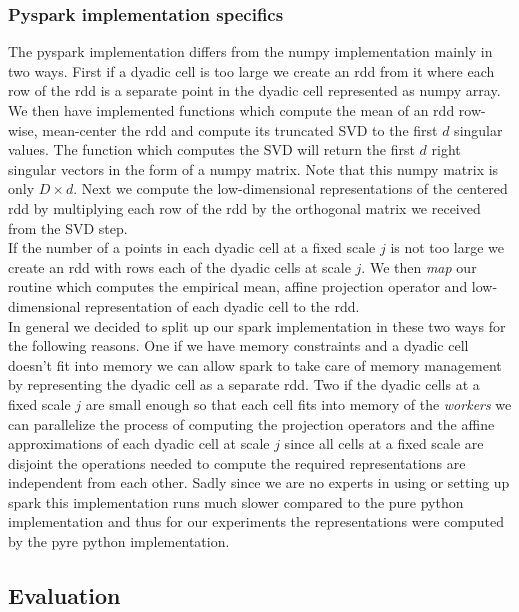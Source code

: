 \documentclass{article}
\begin{document}
  \subsubsection{Pyspark implementation specifics}
  The pyspark implementation differs from the numpy implementation mainly in two ways. First if a dyadic cell is too large we create an rdd from it where each row of the rdd is a separate point in the dyadic cell represented as numpy array. We then have implemented functions which compute the mean of an rdd row-wise, mean-center the rdd and compute its truncated SVD to the first $d$ singular values. The function which computes the SVD will return the first $d$ right singular vectors in the form of a numpy matrix. Note that this numpy matrix is only $D\times d$. Next we compute the low-dimensional representations of the centered rdd by multiplying each row of the rdd by the orthogonal matrix we received from the SVD step.\\
  If the number of a points in each dyadic cell at a fixed scale $j$ is not too large we create an rdd with rows each of the dyadic cells at scale $j$. We then \textit{map} our routine which computes the empirical mean, affine projection operator and low-dimensional representation of each dyadic cell to the rdd.\\
  In general we decided to split up our spark implementation in these two ways for the following reasons. One if we have memory constraints and a dyadic cell doesn't fit into memory we can allow spark to take care of memory management by representing the dyadic cell as a separate rdd. Two if the dyadic cells at a fixed scale $j$ are small enough so that each cell fits into memory of the \textit{workers} we can parallelize the process of computing the projection operators and the affine approximations of each dyadic cell at scale $j$ since all cells at a fixed scale are disjoint the operations needed to compute the required representations are independent from each other. Sadly since we are no experts in using or setting up spark this implementation runs much slower compared to the pure python implementation and thus for our experiments the representations were computed by the pyre python implementation.
\subsection{Evaluation}
{\color{red}{TODO: explain what experiments were ran, what is the baseline, what classifiers were used, the observed results, etc.}}
\end{document}
